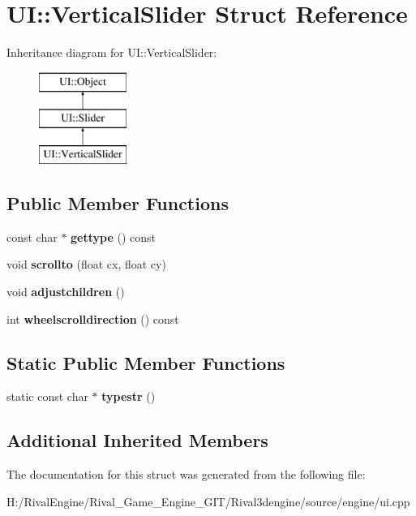 \hypertarget{struct_u_i_1_1_vertical_slider}{}\section{UI\+:\+:Vertical\+Slider Struct Reference}
\label{struct_u_i_1_1_vertical_slider}
Inheritance diagram for UI\+:\+:Vertical\+Slider\+:\begin{figure}[H]
\begin{center}
\leavevmode
\includegraphics[height=3.000000cm]{struct_u_i_1_1_vertical_slider}
\end{center}
\end{figure}
\subsection*{Public Member Functions}
\begin{DoxyCompactItemize}
\item 
\mbox{\label{struct_u_i_1_1_vertical_slider_abdb5892a0bcd1b0687bac34bd4b30d88}} 
const char $\ast$ {\bfseries gettype} () const
\item 
\mbox{\label{struct_u_i_1_1_vertical_slider_a8ecb76f424154567639f3572530e0ba2}} 
void {\bfseries scrollto} (float cx, float cy)
\item 
\mbox{\label{struct_u_i_1_1_vertical_slider_a6a64b9ed9bd3a22febc0a270d9903ec5}} 
void {\bfseries adjustchildren} ()
\item 
\mbox{\label{struct_u_i_1_1_vertical_slider_a3bdad32ffa21bb44e9b7abf7ef9098d1}} 
int {\bfseries wheelscrolldirection} () const
\end{DoxyCompactItemize}
\subsection*{Static Public Member Functions}
\begin{DoxyCompactItemize}
\item 
\mbox{\label{struct_u_i_1_1_vertical_slider_a8651435b93ebe434798a2a156ae74fa2}} 
static const char $\ast$ {\bfseries typestr} ()
\end{DoxyCompactItemize}
\subsection*{Additional Inherited Members}


The documentation for this struct was generated from the following file\+:\begin{DoxyCompactItemize}
\item 
H\+:/\+Rival\+Engine/\+Rival\+\_\+\+Game\+\_\+\+Engine\+\_\+\+G\+I\+T/\+Rival3dengine/source/engine/ui.\+cpp\end{DoxyCompactItemize}
